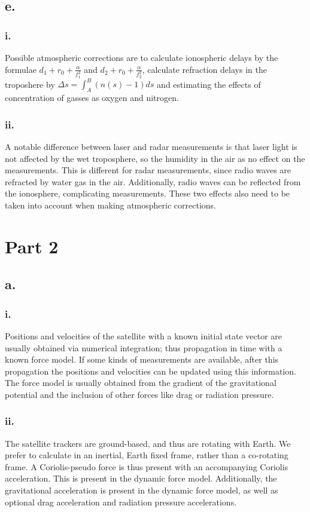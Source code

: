 \documentclass[a4paper,10pt,titlepage]{article}
\begin{document}
\subsection*{e.}
\subsubsection*{i.}
Possible atmospheric corrections are to calculate ionospheric delays by the formulae $d_1 + r_0 + \frac{\alpha}{f_1^2}$ and $d_2 + r_0 + \frac{\alpha}{f_2^2}$, calculate refraction delays in the troposhere by $\Delta s = \int_A^B (n(s)-1)ds$ and estimating the effects of concentration of gasses as oxygen and nitrogen.
\subsubsection*{ii.}
A notable difference between laser and radar measurements is that laser light is not affected by the wet troposphere, so the humidity in the air as no effect on the measurements. This is different for radar measurements, since radio waves are refracted by water gas in the air. Additionally, radio waves can be reflected from the ionosphere, complicating measurements. These two effects also need to be taken into account when making atmospheric corrections.


\section{Part 2}
\subsection*{a.}
\subsubsection*{i.}
Positions and velocities of the satellite with a known initial state vector are usually obtained via numerical integration; thus propagation in time with a known force model. If some kinds of measurements are available, after this propagation the positions and velocities can be updated using this information. The force model is usually obtained from the gradient of the gravitational potential and the inclusion of other forces like drag or radiation pressure.
\subsubsection*{ii.}
The satellite trackers are ground-based, and thus are rotating with Earth. We prefer to calculate in an inertial, Earth fixed frame, rather than a co-rotating frame. A Coriolis-pseudo force is thus present with an accompanying Coriolis acceleration. This is present in the dynamic force model. Additionally, the gravitational acceleration is present in the dynamic force model, as well as optional drag acceleration and radiation pressure accelerations. 
\end{document}
